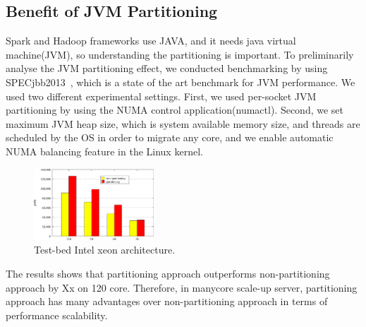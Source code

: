 \ifkor
\else

\fi



\subsection{Benefit of JVM Partitioning}


Spark and Hadoop frameworks use JAVA, and it needs java virtual machine(JVM), so
understanding the partitioning is important.
To preliminarily analyse the JVM partitioning effect, we conducted
benchmarking by using SPECjbb2013~\cite{Pogue2014SO}, which is a state of the art
benchmark for JVM performance.
We used two different experimental settings. 
First, we used per-socket JVM partitioning by using the NUMA control application(numactl).
Second, we set maximum JVM heap size, which is system
available memory size, and threads are scheduled by the OS
in order to migrate any core, and we enable automatic NUMA balancing feature
in the Linux kernel.

\begin{figure}[h]
  \begin{center}
     \includegraphics[width=0.4\textwidth]{graph/SPECjbb2013}
  \end{center}
  \caption{Test-bed Intel xeon architecture.}
  \label{fig:basic}
\end{figure}

The results shows that partitioning approach outperforms non-partitioning approach by Xx on 120 core.
Therefore, in manycore scale-up server, partitioning approach has many
advantages over non-partitioning approach in terms of performance scalability.